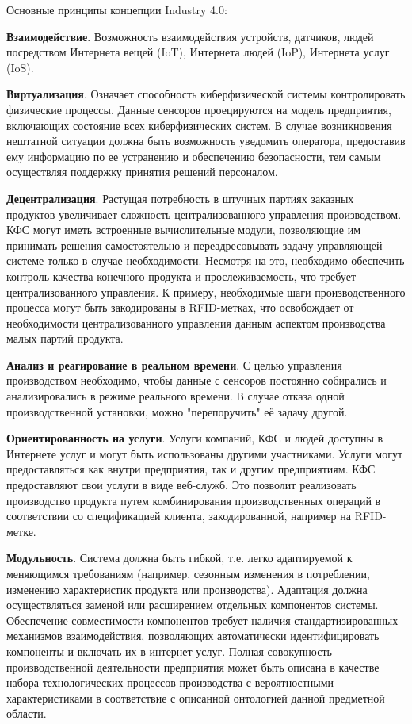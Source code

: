 Основные принципы концепции Industry 4.0:

\begin{textitemize}
\item \textbf{Взаимодействие}. Возможность взаимодействия устройств, датчиков, людей посредством Интернета вещей (IoT), Интернета людей (IoP), Интернета услуг (IoS).
\item \textbf{Виртуализация}. Означает способность киберфизической системы контролировать физические процессы. Данные сенсоров проецируются на модель предприятия, включающих состояние всех киберфизических систем. В случае возникновения нештатной ситуации должна быть возможность уведомить оператора, предоставив ему информацию по ее устранению и обеспечению безопасности, тем самым осуществляя поддержку принятия решений персоналом.
\item \textbf{Децентрализация}. Растущая потребность в штучных партиях заказных продуктов увеличивает сложность централизованного управления производством. КФС могут иметь встроенные вычислительные модули, позволяющие им принимать решения самостоятельно и переадресовывать задачу управляющей системе только в случае необходимости. Несмотря на это, необходимо обеспечить контроль качества конечного продукта и прослеживаемость, что требует централизованного управления. К примеру, необходимые шаги производственного процесса могут быть закодированы в RFID-метках, что освобождает от необходимости централизованного управления данным аспектом производства малых партий продукта.
\item \textbf{Анализ и реагирование в реальном времени}. С целью управления производством необходимо, чтобы данные с сенсоров постоянно собирались и анализировались в режиме реального времени. В случае отказа одной производственной установки, можно "перепоручить"{} её задачу другой.
\item \textbf{Ориентированность на услуги}. Услуги компаний, КФС и людей доступны в Интернете услуг и могут быть использованы другими участниками. Услуги могут предоставляться как внутри предприятия, так и другим предприятиям. КФС предоставляют свои услуги в виде веб-служб. Это позволит реализовать производство продукта путем комбинирования производственных операций в соответствии со спецификацией клиента, закодированной, например на RFID-метке.
\item \textbf{Модульность}. Система должна быть гибкой, т.е. легко адаптируемой к меняющимся требованиям (например, сезонным изменения в потреблении, изменению характеристик продукта или производства). Адаптация должна осуществляться заменой или расширением отдельных компонентов системы. Обеспечение совместимости компонентов требует наличия стандартизированных механизмов взаимодействия, позволяющих автоматически идентифицировать компоненты и включать их в интернет услуг.
Полная совокупность производственной деятельности предприятия может быть описана в качестве набора технологических процессов производства с вероятностными характеристиками в соответствие с описанной онтологией данной предметной области.
\end{textitemize}

